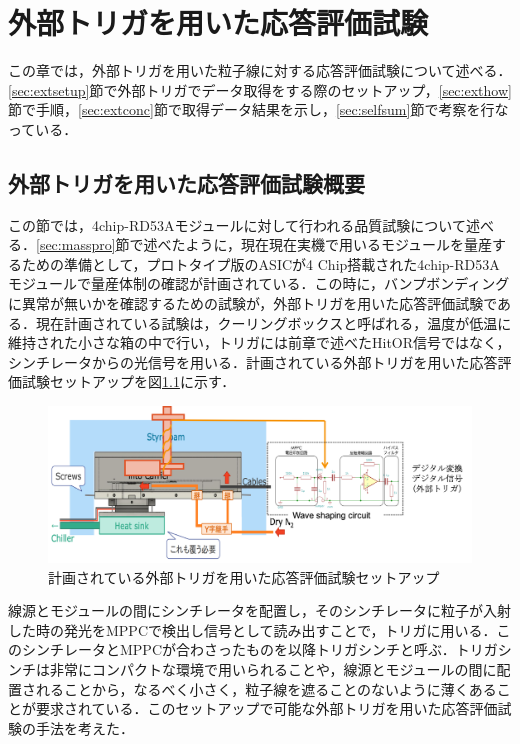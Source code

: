 \chapter{外部トリガを用いた応答評価試験}
この章では，外部トリガを用いた粒子線に対する応答評価試験について述べる．\ref{sec:extsetup}節で外部トリガでデータ取得をする際のセットアップ，\ref{sec:exthow}節で手順，\ref{sec:extconc}節で取得データ結果を示し，\ref{sec:selfsum}節で考察を行なっている．

\section{外部トリガを用いた応答評価試験概要}
この節では，4chip-RD53Aモジュールに対して行われる品質試験について述べる．\ref{sec:masspro}節で述べたように，現在現在実機で用いるモジュールを量産するための準備として，プロトタイプ版のASICが4 $\mathrm{Chip}$搭載された4chip-RD53Aモジュールで量産体制の確認が計画されている．この時に，バンプボンディングに異常が無いかを確認するための試験が，外部トリガを用いた応答評価試験である．現在計画されている試験は，クーリングボックスと呼ばれる，温度が低温に維持された小さな箱の中で行い，トリガには前章で述べたHitOR信号ではなく，シンチレータからの光信号を用いる．計画されている外部トリガを用いた応答評価試験セットアップを図\ref{fig:trigplan}に示す．

\begin{figure}[h]
  \centering
  \includegraphics[width=12cm]{./figure/trigplan.png}
  \caption{計画されている外部トリガを用いた応答評価試験セットアップ}
  \label{fig:trigplan}
\end{figure}


線源とモジュールの間にシンチレータを配置し，そのシンチレータに粒子が入射した時の発光をMPPCで検出し信号として読み出すことで，トリガに用いる．このシンチレータとMPPCが合わさったものを以降トリガシンチと呼ぶ．トリガシンチは非常にコンパクトな環境で用いられることや，線源とモジュールの間に配置されることから，なるべく小さく，粒子線を遮ることのないように薄くあることが要求されている．このセットアップで可能な外部トリガを用いた応答評価試験の手法を考えた．


